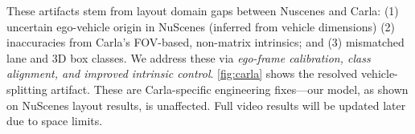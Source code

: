These artifacts stem from layout domain gaps between Nuscenes and Carla: (1) uncertain ego-vehicle origin in NuScenes (inferred from vehicle dimensions) (2) inaccuracies from Carla’s FOV-based, non-matrix intrinsics; and (3) mismatched lane and 3D box classes. We address these via \textit{ego-frame calibration, class alignment, and improved intrinsic control}. \cref{fig:carla} shows the resolved vehicle-splitting artifact. These are Carla-specific engineering fixes—our model, as shown on NuScenes layout results, is unaffected. Full video results will be updated later due to space limits.
 
 
 









